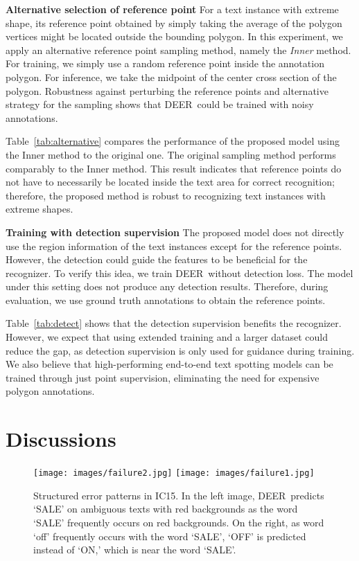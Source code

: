\documentclass[10pt,twocolumn,letterpaper]{article}
\newcommand{\Table}[1]{Table~\ref{tab:#1}}
\newcommand{\methodname}[0]{DEER}
\begin{document}
\noindent\textbf{Alternative selection of reference point} 
For a text instance with extreme shape, its reference point obtained by simply taking the average of the polygon vertices might be located outside the bounding polygon.
In this experiment, we apply an alternative reference point sampling method, namely the \textit{Inner} method. For training, we simply use a random reference point inside the annotation polygon. For inference, we take the midpoint of the center cross section of the polygon.
Robustness against perturbing the reference points and alternative strategy for the sampling shows that \methodname~could be trained with noisy annotations.

\Table{alternative} compares the performance of the proposed model using the Inner method to the original one. The original sampling method performs comparably to the Inner method. This result indicates that reference points do not have to necessarily be located inside the text area for correct recognition; therefore, the proposed method is robust to recognizing text instances with extreme shapes.

\noindent\textbf{Training with detection supervision}
The proposed model does not directly use the region information of the text instances except for the reference points. However, the detection could guide the features to be beneficial for the recognizer. 
To verify this idea, we train \methodname~without detection loss. The model under this setting does not produce any detection results. Therefore, during evaluation, we use ground truth annotations to obtain the reference points.

\Table{detect} shows that the detection supervision benefits the recognizer. However, we expect that using extended training and a larger dataset could reduce the gap, as detection supervision is only used for guidance during training. We also believe that high-performing end-to-end text spotting models can be trained through just point supervision, eliminating the need for expensive polygon annotations.


 
\section{Discussions}
\begin{figure}[t]
  \centering
\texttt{[image: images/failure2.jpg]}
    \texttt{[image: images/failure1.jpg]}
   \caption{Structured error patterns in IC15. In the left image, \methodname~predicts `SALE' on ambiguous texts with red backgrounds as the word `SALE' frequently occurs on red backgrounds. On the right, as word `off' frequently occurs with the word `SALE', `OFF' is predicted instead of `ON,' which is near the word `SALE'.}
    \label{fig:potential}
\end{figure}
\end{document}
